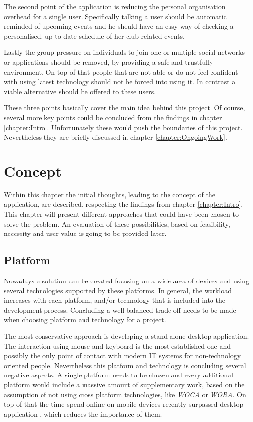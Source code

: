 The second point of the application is reducing the personal organisation overhead for a single user. Specifically talking a user should be automatic reminded of upcoming events and he should have an easy way of checking a personalised, up to date schedule of her club related events.

Lastly the group pressure on individuals to join one or multiple social networks or applications should be removed, by providing a safe and trustfully environment. On top of that people that are not able or do not feel confident with using latest technology should not be forced into using it. In contrast a viable alternative should be offered to these users. 

These three points basically cover the main idea behind this project. Of course, several more key points could be concluded from the findings in chapter \vref{chapter:Intro}. Unfortunately these would push the boundaries of this project. Nevertheless they are briefly discussed in chapter \vref{chapter:OngoingWork}.

\chapter{Concept}
\label{chapter:Concept}
Within this chapter the initial thoughts, leading to the concept of the application, are described, respecting the findings from chapter \ref{chapter:Intro}. This chapter will present different approaches that could have been chosen to solve the problem. An evaluation of these possibilities, based on feasibility, necessity and user value is going to be provided later.

\section{Platform} %
\label{sec:Platform}
Nowadays a solution can be created focusing on a wide area of devices and using several technologies supported by these platforms. In general, the workload increases with each platform, and/or technology that is included into the development process. Concluding a well balanced trade-off needs to be made when choosing platform and technology for a project.

The most conservative approach is developing a stand-alone desktop application. The interaction using mouse and keyboard is the most established one and possibly the only point of contact with modern \acrshort{IT} systems for non-technology oriented people. Nevertheless this platform and technology is concluding several negative aspects: A single platform needs to be chosen and every additional platform would include a massive amount of supplementary work, based on the assumption of not using cross platform technologies, like \emph{\Acrfull{WOCA}} or \emph{\Acrfull{WORA}}. On top of that the time spend online on mobile devices recently surpassed desktop application \cite{Murtagh:2014aa}, which reduces the importance of them. 

